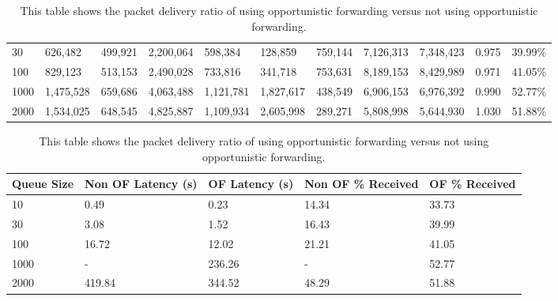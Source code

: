 \begin{landscape}
\begin{table}
\begin{tabularx}{\linewidth}{|X|X|X|X|X|X|X|X|X|X|X|}
                    30 & 626,482 & 499,921 & 2,200,064 & 598,384 & 128,859 & 759,144 & 7,126,313 & 7,348,423 & 0.975 & 39.99\% \\
                    100 & 829,123 & 513,153 & 2,490,028 & 733,816 & 341,718 & 753,631 & 8,189,153 & 8,429,989 & 0.971 & 41.05\% \\
                    1000 & 1,475,528 & 659,686 & 4,063,488 & 1,121,781 & 1,827,617 & 438,549 & 6,906,153 & 6,976,392 & 0.990 & 52.77\% \\
                    2000 & 1,534,025 & 648,545 & 4,825,887 & 1,109,934 & 2,605,998 & 289,271 & 5,808,998 & 5,644,930 & 1.030 & 51.88\% \\
                    \hline
                \end{tabularx}
                \caption{These two tables are part of the same table, split across the page. They show the results of using opportunistic forwarding.}
                \label{tab:opportunistic_forwarding_first}
                \begin{tabularx}{0.6\linewidth}{|X|X|X|X|X|}
                    \hline
                    \multicolumn{1}{|X|}{\centering Queue Size} & 
                    \multicolumn{1}{|X|}{\centering Non OF Latency (s)} & 
                    \multicolumn{1}{|X|}{\centering OF Latency (s)} & 
                    \multicolumn{1}{|X|}{\centering Non OF \% Received} & 
                    \multicolumn{1}{|X|}{\centering OF \% Received} \\
                    \hline
                    10 & 0.49 & 0.23 & 14.34 & 33.73 \\
                    30 & 3.08 & 1.52 & 16.43 & 39.99 \\
                    100 & 16.72 & 12.02 & 21.21 & 41.05 \\
                    1000 & - & 236.26 & - & 52.77 \\
                    2000 & 419.84 & 344.52 & 48.29 & 51.88 \\
                    \hline
                \end{tabularx}
                \caption{This table shows the packet delivery ratio of using opportunistic forwarding versus not using opportunistic forwarding.}
                \label{tab:opportunistic_forwarding}
            \end{table}
        \end{landscape}


